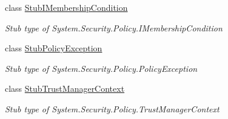 \begin{DoxyCompactItemize}
class \hyperlink{class_system_1_1_security_1_1_policy_1_1_fakes_1_1_stub_i_membership_condition}{Stub\-I\-Membership\-Condition}
\begin{DoxyCompactList}\small\item\em Stub type of System.\-Security.\-Policy.\-I\-Membership\-Condition\end{DoxyCompactList}\item 
class \hyperlink{class_system_1_1_security_1_1_policy_1_1_fakes_1_1_stub_policy_exception}{Stub\-Policy\-Exception}
\begin{DoxyCompactList}\small\item\em Stub type of System.\-Security.\-Policy.\-Policy\-Exception\end{DoxyCompactList}\item 
class \hyperlink{class_system_1_1_security_1_1_policy_1_1_fakes_1_1_stub_trust_manager_context}{Stub\-Trust\-Manager\-Context}
\begin{DoxyCompactList}\small\item\em Stub type of System.\-Security.\-Policy.\-Trust\-Manager\-Context\end{DoxyCompactList}\end{DoxyCompactItemize}
